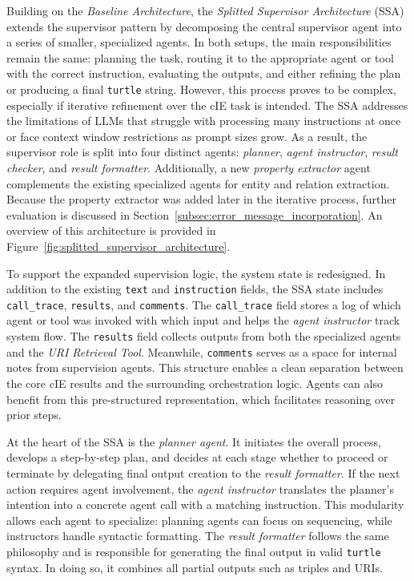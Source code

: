 \documentclass[a4paper,oneside,bibliography=totoc]{scrbook}
\begin{document}
Building on the \textit{Baseline Architecture}, the \textit{Splitted Supervisor Architecture} (\ac{SSA}) extends the supervisor pattern by decomposing the central supervisor agent into a series of smaller, specialized agents. In both setups, the main responsibilities remain the same: planning the task, routing it to the appropriate agent or tool with the correct instruction, evaluating the outputs, and either refining the plan or producing a final \texttt{turtle} string. However, this process proves to be complex, especially if iterative refinement over the \ac{cIE} task is intended. The \ac{SSA} addresses the limitations of \acp{LLM} that struggle with processing many instructions at once or face context window restrictions as prompt sizes grow. As a result, the supervisor role is split into four distinct agents: \textit{planner}, \textit{agent instructor}, \textit{result checker}, and \textit{result formatter}. Additionally, a new \textit{property extractor} agent complements the existing specialized agents for entity and relation extraction. Because the property extractor was added later in the iterative process, further evaluation is discussed in Section~\ref{subsec:error_message_incorporation}. An overview of this architecture is provided in Figure~\ref{fig:splitted_supervisor_architecture}.

To support the expanded supervision logic, the system state is redesigned. In addition to the existing \texttt{text} and \texttt{instruction} fields, the \ac{SSA} state includes \texttt{call\_trace}, \texttt{results}, and \texttt{comments}. The \texttt{call\_trace} field stores a log of which agent or tool was invoked with which input and helps the \textit{agent instructor} track system flow. The \texttt{results} field collects outputs from both the specialized agents and the \textit{URI Retrieval Tool}. Meanwhile, \texttt{comments} serves as a space for internal notes from supervision agents. This structure enables a clean separation between the core \ac{cIE} results and the surrounding orchestration logic. Agents can also benefit from this pre-structured representation, which facilitates reasoning over prior steps.

At the heart of the \ac{SSA} is the \textit{planner agent}. It initiates the overall process, develops a step-by-step plan, and decides at each stage whether to proceed or terminate by delegating final output creation to the \textit{result formatter}. If the next action requires agent involvement, the \textit{agent instructor} translates the planner's intention into a concrete agent call with a matching instruction. This modularity allows each agent to specialize: planning agents can focus on sequencing, while instructors handle syntactic formatting. The \textit{result formatter} follows the same philosophy and is responsible for generating the final output in valid \texttt{turtle} syntax. In doing so, it combines all partial outputs such as triples and \acp{URI}.
\end{document}

